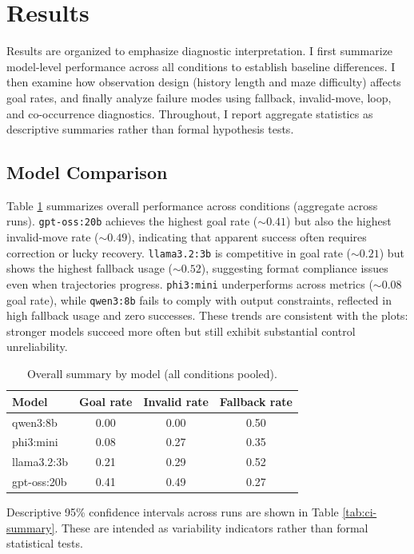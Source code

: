 \documentclass[conference]{IEEEtran}
\begin{document}
\section{Results}
Results are organized to emphasize diagnostic interpretation. I first summarize model-level performance across all conditions to establish baseline differences. I then examine how observation design (history length and maze difficulty) affects goal rates, and finally analyze failure modes using fallback, invalid-move, loop, and co-occurrence diagnostics. Throughout, I report aggregate statistics as descriptive summaries rather than formal hypothesis tests.
\subsection{Model Comparison}
Table \ref{tab:model-summary} summarizes overall performance across conditions (aggregate across runs). \texttt{gpt-oss:20b} achieves the highest goal rate (\(\sim 0.41\)) but also the highest invalid-move rate (\(\sim 0.49\)), indicating that apparent success often requires correction or lucky recovery. \texttt{llama3.2:3b} is competitive in goal rate (\(\sim 0.21\)) but shows the highest fallback usage (\(\sim 0.52\)), suggesting format compliance issues even when trajectories progress. \texttt{phi3:mini} underperforms across metrics (\(\sim 0.08\) goal rate), while \texttt{qwen3:8b} fails to comply with output constraints, reflected in high fallback usage and zero successes. These trends are consistent with the plots: stronger models succeed more often but still exhibit substantial control unreliability.

\begin{table}[!htbp]
\centering
\caption{Overall summary by model (all conditions pooled).}
\label{tab:model-summary}
\begin{tabular}{lccc}
\toprule
Model & Goal rate & Invalid rate & Fallback rate \\
\midrule
qwen3:8b & 0.00 & 0.00 & 0.50 \\
phi3:mini & 0.08 & 0.27 & 0.35 \\
llama3.2:3b & 0.21 & 0.29 & 0.52 \\
gpt-oss:20b & 0.41 & 0.49 & 0.27 \\
\bottomrule
\end{tabular}
\end{table}
Descriptive 95\% confidence intervals across runs are shown in Table \ref{tab:ci-summary}. These are intended as variability indicators rather than formal statistical tests.
\end{document}

